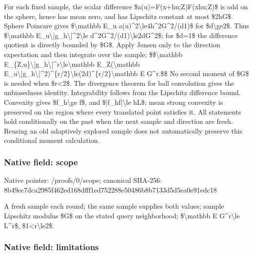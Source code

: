 \documentclass[10pt,a4paper]{article}
\begin{document}
For each fixed sample, the scalar difference \$a(u)=F(x+hu;Z)F(xhu;Z)\$ is odd on the sphere, hence has mean zero, and has Lipschitz constant at most \$2hG\$. Sphere Poincare gives \$\textbackslash{}mathbb E\_u a(u)\textasciicircum{}2\textbackslash{}le4h\textasciicircum{}2G\textasciicircum{}2/(d1)\$ for \$d\textbackslash{}ge2\$. Thus \$\textbackslash{}mathbb E\_u\textbackslash{}|g\_h\textbackslash{}|\textasciicircum{}2\textbackslash{}le d\textasciicircum{}2G\textasciicircum{}2/(d1)\textbackslash{}le2dG\textasciicircum{}2\$; for \$d=1\$ the difference quotient is directly bounded by \$G\$. Apply Jensen only to the direction expectation and then integrate over the sample:
\$\$\textbackslash{}mathbb E\_\{Z,u\}\textbackslash{}|g\_h\textbackslash{}|\textasciicircum{}r\textbackslash{}le\textbackslash{}mathbb E\_Z(\textbackslash{}mathbb E\_u\textbackslash{}|g\_h\textbackslash{}|\textasciicircum{}2)\textasciicircum{}\{r/2\}\textbackslash{}le(2d)\textasciicircum{}\{r/2\}\textbackslash{}mathbb E G\textasciicircum{}r.\$\$
No second moment of \$G\$ is needed when \$r<2\$. The divergence theorem for ball convolution gives the unbiasedness identity. Integrability follows from the Lipschitz difference bound. Convexity gives \$f\_h\textbackslash{}ge f\$, and \$|f\_hf|\textbackslash{}le hL\$; mean strong convexity is preserved on the region where every translated point satisfies it. All statements hold conditionally on the past when the next sample and direction are fresh. Reusing an old adaptively explored sample does not automatically preserve this conditional moment calculation.


\subsubsection{Native field: scope}


Native pointer: /proofs/0/scope; canonical SHA-256: 8b49ec7dca2985f462ed168d\allowbreak{}fff1ed752288e50486b8b713\allowbreak{}3d5d5ea0e91edc18


A fresh sample each round; the same sample supplies both values; sample Lipschitz modulus \$G\$ on the stated query neighborhood; \$\textbackslash{}mathbb E G\textasciicircum{}r\textbackslash{}le L\textasciicircum{}r\$, \$1<r\textbackslash{}le2\$.


\subsubsection{Native field: limitations}
\end{document}

